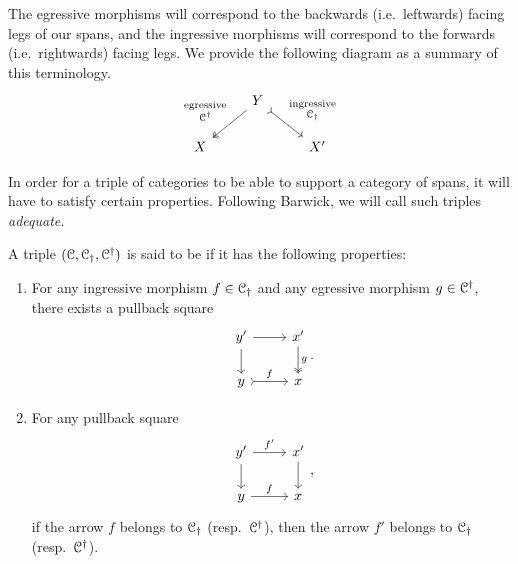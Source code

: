 \documentclass[main.tex]{subfiles}
\begin{document}
The egressive morphisms will correspond to the backwards (i.e.\ leftwards) facing legs of our spans, and the ingressive morphisms will correspond to the forwards (i.e.\ rightwards) facing legs. We provide the following diagram as a summary of this terminology.
\begin{equation*}
  \begin{tikzcd}
    & Y
    \arrow[dl, two heads, swap, "\substack{\text{egressive} \\ \category{C}\updag}"]
    \arrow[dr, rightarrowtail, "\substack{\text{ingressive} \\ \category{C}\downdag}"]
    \\
    X
    && X'
  \end{tikzcd}
\end{equation*}

In order for a triple of categories to be able to support a category of spans, it will have to satisfy certain properties. Following Barwick, we will call such triples \emph{adequate.}

\begin{definition}
  \label{def:adequate_triple}
  A triple $(\mathcal{C}, \mathcal{C}_{\dagger}, \mathcal{C}^{\dagger})$ is said to be  if it has the following properties:
  \begin{enumerate}
    \item For any ingressive morphism $f \in \mathcal{C}_{\dagger}$ and any egressive morphism $g \in \mathcal{C}^{\dagger}$, there exists a pullback square
      \begin{equation*}
        \begin{tikzcd}
          y'
          \arrow[r]
          \arrow[d]
          & x'
          \arrow[d, two heads, "g"]
          \\
          y
          \arrow[r, rightarrowtail, "f"]
          & x
        \end{tikzcd}.
      \end{equation*}

    \item For any pullback square
      \begin{equation*}
        \begin{tikzcd}
          y'
          \arrow[r, "f'"]
          \arrow[d]
          & x'
          \arrow[d]
          \\
          y
          \arrow[r, "f"]
          & x
        \end{tikzcd},
      \end{equation*}
      if the arrow $f$ belongs to $\mathcal{C}_{\dagger}$ (resp.\ $\mathcal{C}^{\dagger}$), then the arrow $f'$ belongs to $\mathcal{C}_{\dagger}$ (resp.\ $\mathcal{C}^{\dagger}$).
  \end{enumerate}
\end{definition}
\end{document}
